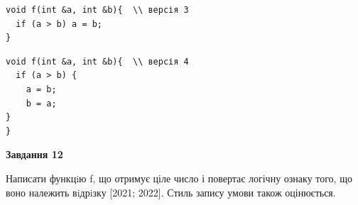 \documentclass[12pt, ukrainian]{article}
\begin{document}
{\begin {large}
\begin{minipage}[t]{11.0cm}
\vspace{-8mm}\begin{verbatim}
void f(int &a, int &b){  \\ версія 3
  if (a > b) a = b;
}
\end{verbatim}

\vspace{-8mm}\begin{verbatim}
void f(int &a, int &b){  \\ версія 4
  if (a > b) {
    a = b;
    b = a;
}  
}
\end{verbatim}



\begin{center}
\textbf{Завдання 12}
\end{center}

Написати функцiю f, що отримує ціле число і повертає логічну ознаку того, що воно належить вiдрiзку [2021; 2022]. Стиль запису умови також оцінюється.\par

\end{minipage}

\end {large}}
\newpage
\end{document}
